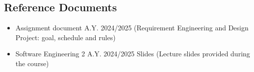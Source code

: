 \subsection{Reference Documents}
\begin{itemize}
    \item Assignment document A.Y. 2024/2025
\newline (Requirement Engineering and Design Project: goal, schedule and rules)
\item Software Engineering 2 A.Y. 2024/2025 Slides
\newline (Lecture slides provided during the course)
\end{itemize}

